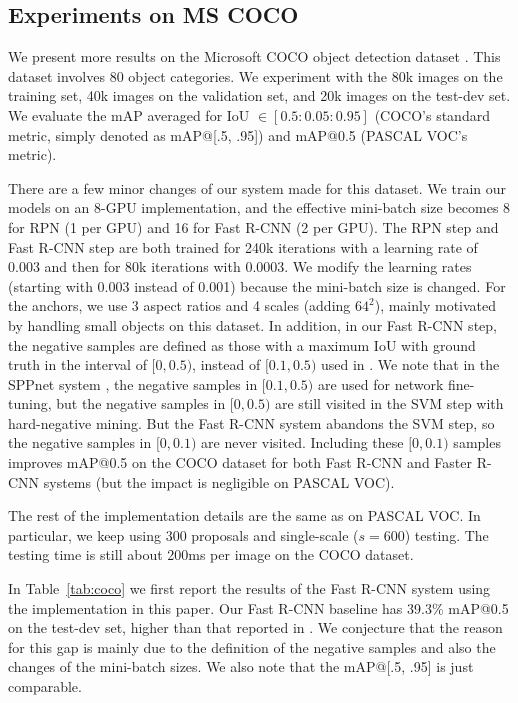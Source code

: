 \documentclass[10pt,journal,cspaper,compsoc]{IEEEtran}
\begin{document}
\subsection{Experiments on MS COCO}

We present more results on the Microsoft COCO object detection dataset \cite{Lin2014}. This dataset involves 80 object categories. We experiment with the 80k images on the training set, 40k images on the validation set, and 20k images on the test-dev set.
We evaluate the mAP averaged for IoU $\in[0.5:0.05:0.95]$ (COCO's standard metric, simply denoted as mAP@[.5, .95]) and mAP@0.5 (PASCAL VOC's metric).

There are a few minor changes of our system made for this dataset. We train our models on an 8-GPU implementation, and the effective mini-batch size becomes 8 for RPN (1 per GPU) and 16 for Fast R-CNN (2 per GPU). The RPN step and Fast R-CNN step are both trained for 240k iterations with a learning rate of 0.003 and then for 80k iterations with 0.0003. We modify the learning rates (starting with 0.003 instead of 0.001) because the mini-batch size is changed.
For the anchors, we use 3 aspect ratios and 4 scales (adding $64^2$), mainly motivated by handling small objects on this dataset. In addition, in our Fast R-CNN step, the negative samples are defined as those with a maximum IoU with ground truth in the interval of $[0, 0.5)$, instead of $[0.1, 0.5)$ used in \cite{He2014,Girshick2015a}. We note that in the SPPnet system \cite{He2014}, the negative samples in $[0.1, 0.5)$ are used for network fine-tuning, but the negative samples in $[0, 0.5)$ are still visited in the SVM step with hard-negative mining. But the Fast R-CNN system \cite{Girshick2015a} abandons the SVM step, so the negative samples in $[0, 0.1)$ are never visited. Including these $[0, 0.1)$ samples improves mAP@0.5 on the COCO dataset for both Fast R-CNN and Faster R-CNN systems (but the impact is negligible on PASCAL VOC).

The rest of the implementation details are the same as on PASCAL VOC. In particular, we keep using 300 proposals and single-scale ($s=600$) testing. The testing time is still about 200ms per image on the COCO dataset.

In Table~\ref{tab:coco} we first report the results of the Fast R-CNN system \cite{Girshick2015a} using the implementation in this paper. Our Fast R-CNN baseline has 39.3\% mAP@0.5 on the test-dev set, higher than that reported in \cite{Girshick2015a}. We conjecture that the reason for this gap is mainly due to the definition of the negative samples and also the changes of the mini-batch sizes. We also note that the mAP@[.5, .95] is just comparable.
\end{document}
